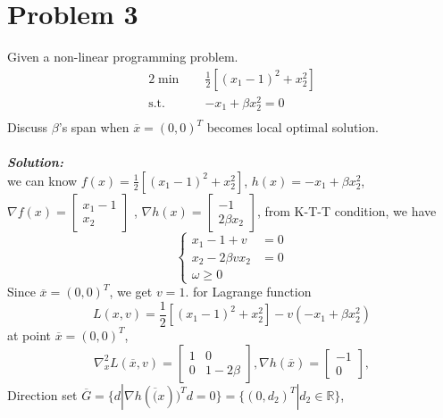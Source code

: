 \documentclass[paper=a4, fontsize=11pt]{scrartcl} %
\numberwithin{equation}{section} %
\numberwithin{figure}{section} %
\numberwithin{table}{section} %
\begin{document}
\section{Problem 3}
Given a non-linear programming problem.
\begin{alignat}{2}          \nonumber
\min\quad & \frac{1}{2}[(x_1-1)^2+x_2^2]\\    \nonumber
\mbox{s.t.}\quad            \nonumber
& -x_1+\beta x_2^2 = 0\\         \nonumber
\end{alignat}
Discuss $\beta$'s span when $\overline{x}=(0,0)^T$ becomes local optimal solution.\\
\\
\emph{\textbf{Solution:}}\\
we can know $f(x)= \frac{1}{2}[(x_1-1)^2+x_2^2]$, $h(x)=-x_1+\beta x_2^2$,\\
$\nabla f(x)= \begin{bmatrix} x_1-1 \\ x_2\end{bmatrix}$ , $\nabla h(x) = \begin{bmatrix} -1 \\ 2\beta x_2\end{bmatrix}$, from K-T-T condition, we have\\
\begin{equation} \nonumber
\left\{
\begin{aligned}
x_1-1+v &= 0\\
x_2-2\beta vx_2 &= 0\\
\omega \geq 0
\end{aligned}
\right.
\end{equation}
Since $\overline{x}=(0,0)^T$, we get $v=1$.
for Lagrange function
\begin{equation} \nonumber
L(x,v) = \frac{1}{2}[(x_1-1)^2+x_2^2] -v(-x_1+\beta x_2^2)
\end{equation}
at point $\overline{x}=(0,0)^T$,
\begin{equation} \nonumber
\nabla^2_x L(\overline{x},v) = \begin{bmatrix} 1 & 0\\0& 1-2\beta\end{bmatrix}, \nabla h(\overline{x}) = \begin{bmatrix}-1\\0\end{bmatrix},
\end{equation}
Direction set $\overline{G}=\{d|\nabla h(\overline(x))^Td=0\}=\{(0,d_2)^T|d_2\in \mathbb{R}\}$,
\end{document}
